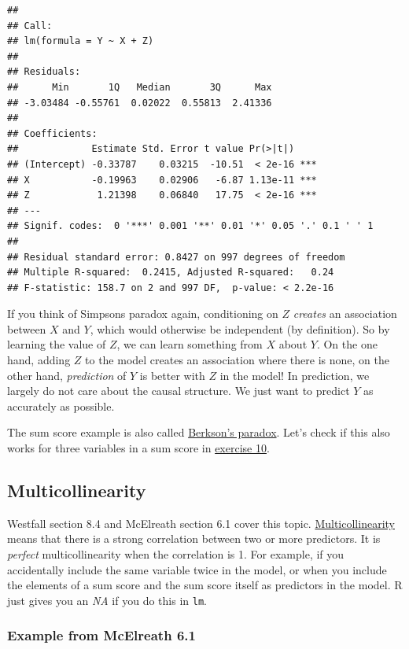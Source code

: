 \documentclass[
]{book}
\newcounter{none} %
\begin{document}
\begin{verbatim}
## 
## Call:
## lm(formula = Y ~ X + Z)
## 
## Residuals:
##      Min       1Q   Median       3Q      Max 
## -3.03484 -0.55761  0.02022  0.55813  2.41336 
## 
## Coefficients:
##             Estimate Std. Error t value Pr(>|t|)    
## (Intercept) -0.33787    0.03215  -10.51  < 2e-16 ***
## X           -0.19963    0.02906   -6.87 1.13e-11 ***
## Z            1.21398    0.06840   17.75  < 2e-16 ***
## ---
## Signif. codes:  0 '***' 0.001 '**' 0.01 '*' 0.05 '.' 0.1 ' ' 1
## 
## Residual standard error: 0.8427 on 997 degrees of freedom
## Multiple R-squared:  0.2415, Adjusted R-squared:   0.24 
## F-statistic: 158.7 on 2 and 997 DF,  p-value: < 2.2e-16
\end{verbatim}

If you think of Simpsons paradox again, conditioning on \(Z\) \emph{creates} an association between \(X\) and \(Y\),
which would otherwise be independent (by definition). So by learning the value of \(Z\), we can learn something
from \(X\) about \(Y\). On the one hand, adding \(Z\) to the model creates an association where there is none,
on the other hand, \emph{prediction} of \(Y\) is better with \(Z\) in the model! In prediction, we largely
do not care about the causal structure. We just want to predict \(Y\) as accurately as possible.

The sum score example is also called \href{https://en.wikipedia.org/wiki/Berkson\%27s_paradox}{Berkson's paradox}.
Let's check if this also works for three variables in a sum score
in \hyperref[exercise10_multiple_regression]{exercise 10}.

\subsection{Multicollinearity}\label{multicollinearity}

Westfall section 8.4 and McElreath section 6.1 cover this topic.
\href{https://en.wikipedia.org/wiki/Multicollinearity}{Multicollinearity} means that there is a strong
correlation between two or more predictors. It is \emph{perfect} multicollinearity when the correlation is 1.
For example, if you accidentally include the same variable twice in the model, or when you include
the elements of a sum score and the sum score itself as predictors in the model. R just gives you
an \emph{NA} if you do this in \texttt{lm}.

\subsubsection{Example from McElreath 6.1}\label{mcElreath_6.1}
\end{document}
